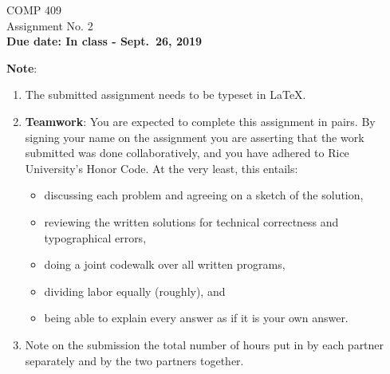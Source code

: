 \headheight 0pt
\setlength{\textwidth}{6.25in}          
\setlength{\oddsidemargin}{0in}   
\setlength{\evensidemargin}{.25in}  

\newcommand{\rarrow}{\rightarrow}
\newcommand{\darrow}{\leftrightarrow}
\newcommand{\logequiv}{{\models =\!\!\!|}}
\renewcommand{\phi}{\varphi}

\pagestyle{empty}

\begin{center}
{\Large COMP 409\\
Assignment No. 2}\\
\bigskip
{\bf Due date: In class - Sept.~26, 2019}
\end{center}

\noindent
{\bf Note}:
\begin{enumerate}
\item
The submitted assignment needs to be typeset in LaTeX.
\item
{\bf Teamwork}: You are expected to complete this assignment in pairs. 
By signing your name on the assignment you are asserting
that the work submitted was done collaboratively, and you have
adhered to Rice University's Honor Code.
At the very least, this entails:
\begin{itemize}
\item
discussing each problem and agreeing on a sketch of the solution,
\item
reviewing the written solutions for technical correctness and
typographical errors,
\item
doing a joint codewalk over all written programs,
\item
dividing labor equally (roughly), and
\item
being able to explain every answer as if it is your own answer.
\end{itemize}
\item
Note on the submission the total number of hours put in by
each partner separately and by the two partners together.
\end{enumerate}

